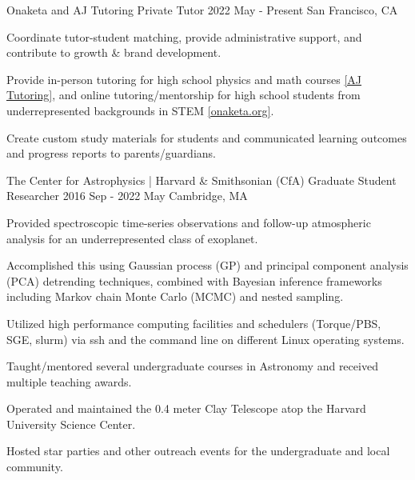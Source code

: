 
\begin{cventries}

  \cventry
    {Onaketa and AJ Tutoring} %
    {Private Tutor} %
    {2022 May - Present} %
    {San Francisco, CA} %
    {
      \begin{cvitems} %
        \item Coordinate tutor-student matching, provide administrative support, and contribute to growth \& brand development.
        \item Provide in-person tutoring for high school physics and math courses \href{https://www.ajtutoring.com/meet-our-team/ian-weaver/}{[AJ Tutoring]}, and online tutoring/mentorship for high school students from underrepresented backgrounds in STEM \href{https://www.onaketa.org/about}{[onaketa.org]}.
        \item Create custom study materials for students and communicated learning outcomes and progress reports to parents/guardians.
      \end{cvitems}
    }
  
  \cventry
    {The Center for Astrophysics | Harvard \& Smithsonian (CfA)} %
    {Graduate Student Researcher} %
    {2016 Sep - 2022 May} %
    {Cambridge, MA} %
    {
      \begin{cvitems} %
        \item Provided spectroscopic time-series observations and follow-up atmospheric analysis for an underrepresented class of exoplanet.
        \item Accomplished this using Gaussian process (GP) and principal component analysis (PCA) detrending techniques, combined with Bayesian inference frameworks including Markov chain Monte Carlo (MCMC) and nested sampling.
        \item Utilized high performance computing facilities and schedulers (Torque/PBS, SGE, slurm) via ssh and the command line on different Linux operating systems.
        \item Taught/mentored several undergraduate courses in Astronomy and received multiple teaching awards.
        \item Operated and maintained the 0.4 meter Clay Telescope atop the Harvard University Science Center.
        \item Hosted star parties and other outreach events for the undergraduate and local community.
      \end{cvitems}
    }
    

\end{cventries}
